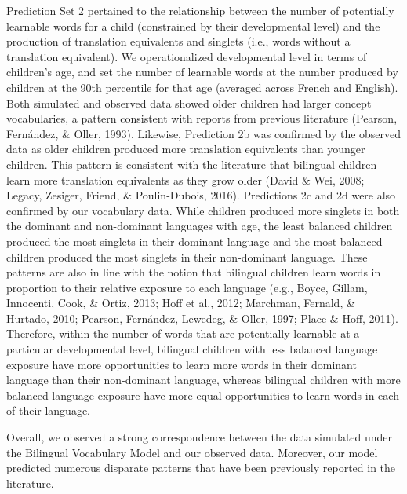 \documentclass[
  english,
  ,man,floatsintext]{apa6}
\begin{document}
Prediction Set 2 pertained to the relationship between the number of potentially learnable words for a child (constrained by their developmental level) and the production of translation equivalents and singlets (i.e., words without a translation equivalent). We operationalized developmental level in terms of children's age, and set the number of learnable words at the number produced by children at the 90th percentile for that age (averaged across French and English). Both simulated and observed data showed older children had larger concept vocabularies, a pattern consistent with reports from previous literature (Pearson, Fernández, \& Oller, 1993). Likewise, Prediction 2b was confirmed by the observed data as older children produced more translation equivalents than younger children. This pattern is consistent with the literature that bilingual children learn more translation equivalents as they grow older (David \& Wei, 2008; Legacy, Zesiger, Friend, \& Poulin-Dubois, 2016). Predictions 2c and 2d were also confirmed by our vocabulary data. While children produced more singlets in both the dominant and non-dominant languages with age, the least balanced children produced the most singlets in their dominant language and the most balanced children produced the most singlets in their non-dominant language. These patterns are also in line with the notion that bilingual children learn words in proportion to their relative exposure to each language (e.g., Boyce, Gillam, Innocenti, Cook, \& Ortiz, 2013; Hoff et al., 2012; Marchman, Fernald, \& Hurtado, 2010; Pearson, Fernández, Lewedeg, \& Oller, 1997; Place \& Hoff, 2011). Therefore, within the number of words that are potentially learnable at a particular developmental level, bilingual children with less balanced language exposure have more opportunities to learn more words in their dominant language than their non-dominant language, whereas bilingual children with more balanced language exposure have more equal opportunities to learn words in each of their language.

Overall, we observed a strong correspondence between the data simulated under the Bilingual Vocabulary Model and our observed data. Moreover, our model predicted numerous disparate patterns that have been previously reported in the literature.
\end{document}
